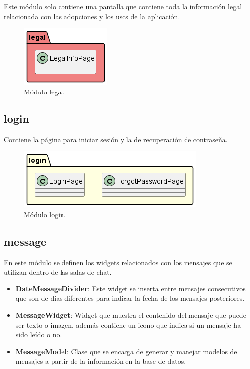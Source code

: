 \documentclass[a4paper, 12pt]{article}
\begin{document}
Este módulo solo contiene una pantalla que contiene toda la información legal relacionada con las adopciones y los usos de la aplicación.

\begin{figure}[H]
	\begin{center}
		{\includegraphics[]{diagram/Legal.png}\par}
		\caption{Módulo legal.}
	\end{center}
\end{figure}


\subsection*{login}


Contiene la página para iniciar sesión y la de recuperación de contraseña.

\begin{figure}[H]
	\begin{center}
		{\includegraphics[width=0.8\linewidth]{diagram/Login.png}\par}
		\caption{Módulo login.}
	\end{center}
\end{figure}


\subsection*{message}

En este módulo se definen los widgets relacionados con los mensajes que se utilizan dentro de las salas de chat.

\begin{itemize}[noitemsep]
	\item \textbf{DateMessageDivider}: Este widget se inserta entre mensajes consecutivos que son de días diferentes para indicar la fecha de los mensajes posteriores.
	\item \textbf{MessageWidget}: Widget que muestra el contenido del mensaje que puede ser texto o imagen, además contiene un icono que indica si un mensaje ha sido leído o no.
	\item \textbf{MessageModel}: Clase que se encarga de generar y manejar modelos de mensajes a partir de la información en la base de datos.
\end{itemize}
\end{document}
